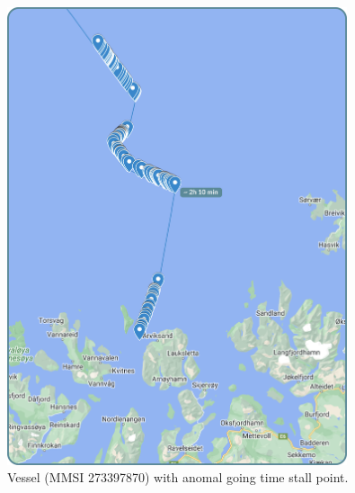 \begin{figure}[H]
    \centering
    \includegraphics[width=10cm]{Images/3/anomaly-3.png}
    \caption{Vessel (MMSI 273397870) with anomal going time stall point.}
\end{figure}
